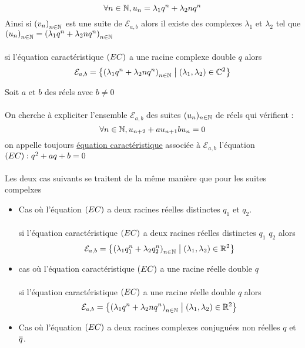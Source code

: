 \begin{dem}
\begin{itemize}
        \[\forall n \in \mathbb{N}, u_n = \lambda_1q^n + \lambda_2 n q^n\]
        Ainsi si \(\left(v_n\right)_{n\in \mathbb{N}}\) est une suite de \(\mathcal{E}_{a,b}\) alors il existe des complexes \(\lambda_1\) et \(\lambda_2\) tel que \(\left(u_n\right)_{n \in \mathbb{N}} = \left( \lambda_1 q^n + \lambda_2 n q^n\right)_{n \in \mathbb{N}}\)\\~\\
        \conclusion si l'équation caractéristique \(\left(EC\right)\) a une racine complexe double \(q\) alors 
        \[\mathcal{E}_{a,b} = \left\lbrace\left(\lambda_1q^n + \lambda_2 n q^n\right)_{n \in \mathbb{N}}\;\middle|\; \left(\lambda_1,\lambda_2\right)\in \mathbb{C}^2\right\rbrace\]
    \end{itemize}
\end{dem}

\begin{dem}
     Soit \(a\) et \(b\) des réels avec \(b\neq 0\)\\~\\
    On cherche à expliciter l'ensemble \(\mathcal{E}_{a,b}\) des suites \((u_n)_{n\in \mathbb{N}}\) de réels qui vérifient : 
    \[\forall n \in \mathbb{N}, u_{n+2} + a u_{n+1} b u_n = 0\]
    on appelle toujours \underline{équation caractéristique} associée à \(\mathcal{E}_{a,b}\) l'équation \(\left(EC\right) : q^2 +aq+b=0\)\\~\\
    Les deux cas suivants se traitent de la même manière que pour les suites compelxes 
    \begin{itemize}
        \item Cas où l'équation \(\left(EC\right)\) a deux racines réelles distinctes \(q_1\) et \(q_2\).\\~\\
        \conclusion si l'équation caractéristique \(\left(EC\right)\) a deux racines réelles distinctes \(q_1\) \(q_2\) alors 
        \[\mathcal{E}_{a,b} = \left\lbrace\left(\lambda_1q_1^n + \lambda_2q_2^n\right)_{n \in \mathbb{N}} \;\middle|\; \left(\lambda_1,\lambda_2\right) \in \mathbb{R}^2\right\rbrace\]
        \item cas où l'équation caractéristique \(\left(EC\right)\) a une racine réelle double \(q\) \\~\\
        \conclusion si l'équation caractéristique \(\left(EC\right)\) a une racine réelle double \(q\) alors 
        \[\mathcal{E}_{a,b} = \left\lbrace\left(\lambda_1q^n + \lambda_2 n q^n\right)_{n \in \mathbb{N}}\;\middle|\; \left(\lambda_1,\lambda_2\right)\in \mathbb{R}^2\right\rbrace\]
        \item Cas où l'équation \(\left(EC\right)\) a deux racines complexes conjuguées non réelles \(q\) et \(\overline{q}\).\\~\\

\end{itemize}
\end{dem}
